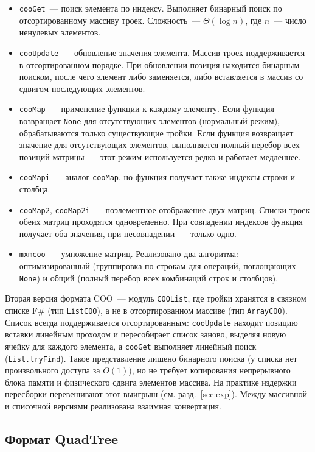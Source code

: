 \documentclass[a4paper]{article}
\begin{document}
\begin{itemize}
    \item \texttt{cooGet}~--- поиск элемента по индексу. Выполняет бинарный поиск по отсортированному массиву троек. Сложность~--- $\Theta(\log n)$, где $n$~--- число ненулевых элементов.
    \item \texttt{cooUpdate}~--- обновление значения элемента. Массив троек поддерживается в отсортированном порядке. При обновлении позиция находится бинарным поиском, после чего элемент либо заменяется, либо вставляется в массив со сдвигом последующих элементов.
    \item \texttt{cooMap}~--- применение функции к каждому элементу. Если функция возвращает \texttt{None} для отсутствующих элементов (нормальный режим), обрабатываются только существующие тройки. Если функция возвращает значение для отсутствующих элементов, выполняется полный перебор всех позиций матрицы~--- этот режим используется редко и работает медленнее.
    \item \texttt{cooMapi}~--- аналог \texttt{cooMap}, но функция получает также индексы строки и столбца.
    \item \texttt{cooMap2}, \texttt{cooMap2i}~--- поэлементное отображение двух матриц. Списки троек обеих матриц проходятся одновременно. При совпадении индексов функция получает оба значения, при несовпадении~--- только одно.
    \item \texttt{mxmcoo}~--- умножение матриц. Реализовано два алгоритма: оптимизированный (группировка по строкам для операций, поглощающих \texttt{None}) и общий (полный перебор всех комбинаций строк и столбцов).
\end{itemize}

Вторая версия формата COO~--- модуль \texttt{COOList}, где тройки хранятся в связном списке F\# (тип \texttt{ListCOO}), а не в отсортированном массиве (тип \texttt{ArrayCOO}). Список всегда поддерживается отсортированным: \texttt{cooUpdate} находит позицию вставки линейным проходом и пересобирает список заново, выделяя новую ячейку для каждого элемента, а \texttt{cooGet} выполняет линейный поиск (\texttt{List.tryFind}). Такое представление лишено бинарного поиска (у списка нет произвольного доступа за $O(1)$), но не требует копирования непрерывного блока памяти и физического сдвига элементов массива. На практике издержки пересборки перевешивают этот выигрыш (см. разд.~\ref{sec:exp}). Между массивной и списочной версиями реализована взаимная конвертация.

\subsection{Формат QuadTree}
\end{document}
